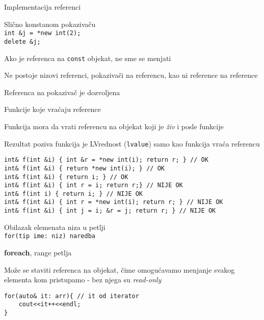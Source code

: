 \documentclass{article}
\newenvironment{xitemize}{%
    
    \itemize
    \larger
}{%
    \enditemize
}
\let\olditemize\itemize
\let\endolditemize\enditemize
\renewenvironment{itemize}{%
    \smaller
    \olditemize
}{%
    \endolditemize
}
\providecommand{\inlinecode}[1]{\texttt{#1}}
\begin{document}
\begin{xitemize}
\item Implementacija referenci
\begin{itemize}
    \item Slično konstanom pokazivaču\\
    \inlinecode{int \&j = *new int(2);}\\
    \inlinecode{delete \&j;}
    \item Ako je referenca na \inlinecode {const} objekat, ne sme se menjati 
    \item Ne postoje nizovi referenci, pokazivači na referencu, kao ni reference na reference
    \item Referenca na pokazivač je dozvoljena
\end{itemize}


\item Funkcije koje vraćaju reference
\begin{itemize}
    \item Funkcija mora da vrati referencu na objekat koji je \textit{živ} i posle funkcije
    \item Rezultat poziva funkcija je LVrednost (\inlinecode {lvalue}) samo kao funkcija vraća referencu
    \begin{lstlisting}
int& f(int &i) { int &r = *new int(i); return r; } // OK
int& f(int &i) { return *new int(i); } // OK
int& f(int &i) { return i; } // OK
int& f(int &i) { int r = i; return r;} // NIJE OK
int& f(int i) { return i; } // NIJE OK
int& f(int &i) { int r = *new int(i); return r; } // NIJE OK
int& f(int &i) { int j = i; &r = j; return r; } // NIJE OK
    \end{lstlisting}
\end{itemize}
\item Obilazak elemenata niza u petlji\\
\inlinecode{for(tip ime: niz) naredba}
\begin{itemize}
\item \textbf{foreach}, range petlja
\item Može se staviti referenca na objekat, čime omogućavamo menjanje svakog elementa kom pristupamo - bez njega su \textit{read-only}
\begin{lstlisting}
for(auto& it: arr){ // it od iterator
    cout<<it++<<endl;
}
\end{lstlisting}


\end{itemize}
\end{xitemize}
\end{document}
